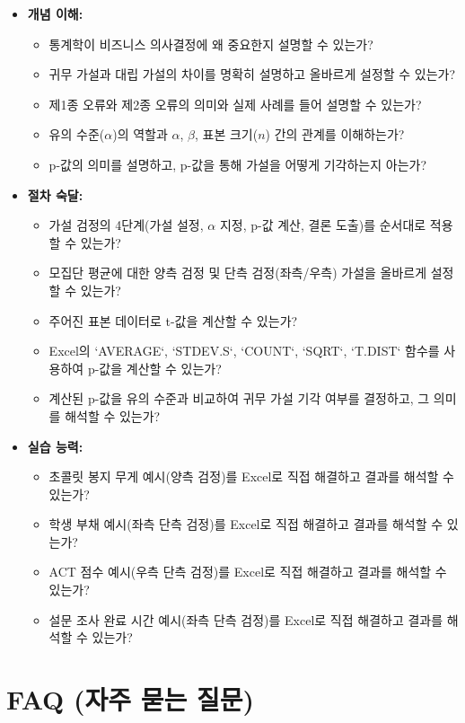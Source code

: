 \documentclass[11pt,a4paper]{article}
\begin{document}
\begin{itemize}
    \item \textbf{개념 이해:}
    \begin{itemize}
        \item 통계학이 비즈니스 의사결정에 왜 중요한지 설명할 수 있는가?
        \item 귀무 가설과 대립 가설의 차이를 명확히 설명하고 올바르게 설정할 수 있는가?
        \item 제1종 오류와 제2종 오류의 의미와 실제 사례를 들어 설명할 수 있는가?
        \item 유의 수준($\alpha$)의 역할과 $\alpha$, $\beta$, 표본 크기($n$) 간의 관계를 이해하는가?
        \item p-값의 의미를 설명하고, p-값을 통해 가설을 어떻게 기각하는지 아는가?
    \end{itemize}
    \item \textbf{절차 숙달:}
    \begin{itemize}
        \item 가설 검정의 4단계(가설 설정, $\alpha$ 지정, p-값 계산, 결론 도출)를 순서대로 적용할 수 있는가?
        \item 모집단 평균에 대한 양측 검정 및 단측 검정(좌측/우측) 가설을 올바르게 설정할 수 있는가?
        \item 주어진 표본 데이터로 t-값을 계산할 수 있는가?
        \item Excel의 `AVERAGE`, `STDEV.S`, `COUNT`, `SQRT`, `T.DIST` 함수를 사용하여 p-값을 계산할 수 있는가?
        \item 계산된 p-값을 유의 수준과 비교하여 귀무 가설 기각 여부를 결정하고, 그 의미를 해석할 수 있는가?
    \end{itemize}
    \item \textbf{실습 능력:}
    \begin{itemize}
        \item 초콜릿 봉지 무게 예시(양측 검정)를 Excel로 직접 해결하고 결과를 해석할 수 있는가?
        \item 학생 부채 예시(좌측 단측 검정)를 Excel로 직접 해결하고 결과를 해석할 수 있는가?
        \item ACT 점수 예시(우측 단측 검정)를 Excel로 직접 해결하고 결과를 해석할 수 있는가?
        \item 설문 조사 완료 시간 예시(좌측 단측 검정)를 Excel로 직접 해결하고 결과를 해석할 수 있는가?
    \end{itemize}
\end{itemize}

\newpage
\section*{FAQ (자주 묻는 질문)}
\end{document}
